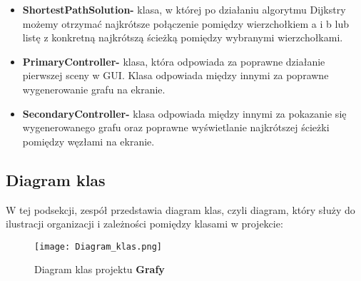 \documentclass[10pt]{article}
\begin{document}
\begin{itemize}
    \item \textbf{ShortestPathSolution-} klasa, w której po działaniu algorytmu Dijkstry możemy otrzymać najkrótsze połączenie pomiędzy wierzchołkiem a i b lub listę z konkretną najkrótszą ścieżką pomiędzy wybranymi wierzchołkami.
    \item \textbf{PrimaryController-} klasa, która odpowiada za poprawne działanie pierwszej sceny w GUI. Klasa odpowiada między innymi za poprawne wygenerowanie grafu na ekranie.
    \item \textbf{SecondaryController-} klasa odpowiada między innymi za pokazanie się wygenerowanego grafu oraz poprawne wyświetlanie najkrótszej ścieżki pomiędzy węzłami na ekranie.
\end{itemize} 
\subsection{Diagram klas}
W tej podsekcji, zespół przedstawia diagram klas, czyli diagram, który służy do ilustracji organizacji i zależności pomiędzy klasami w projekcie:
\begin{figure}[h]
\centering
\texttt{[image: Diagram\_klas.png]}
\caption{Diagram klas projektu \textbf{Grafy}}
\end{figure}
\newpage
\end{document}
